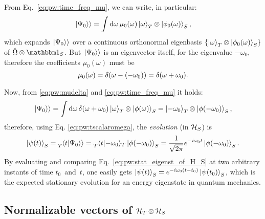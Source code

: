 From Eq.~\eqref{eq:pw:time_freq_mu}, we can write, in particular:
\begin{equation}
  \left.\left| \Psi_0 \right\rangle\right\rangle =
    \int \dd{\omega} \mu_0(\omega) \ket{\omega}_{T} \otimes \ket{\phi_0(\omega)}_{S} \text{,}
\end{equation}
which expands $\left.\left| \Psi_0 \right\rangle\right\rangle$ over a continuous orthonormal eigenbasis
$\left\{\ket{\omega}_{T} \otimes \ket{\phi_0(\omega)}_{S}\right\}$
of $\op{\Omega} \ox \idop_S$.
But $\left.\left| \Psi_0 \right\rangle\right\rangle$ is an eigenvector itself,
for the eigenvalue $-\omega_0$,
therefore the coefficients $\mu_0(\omega)$ must be
\begin{equation}\label{eq:pw:mudelta}
  \mu_0(\omega) = \delta\qty(\omega - \qty(-\omega_0) ) = \delta\qty(\omega + \omega_0) \text{.}
\end{equation}

Now, from \eqref{eq:pw:mudelta} and \eqref{eq:pw:time_freq_mu} it holds:
\[
  \left.\left| \Psi_0 \right\rangle\right\rangle = \int \dd{\omega} \delta(\omega + \omega_0) \ket{\omega}_T \otimes \ket{\phi(\omega)}_S =
    \ket{-\omega_0}_T \otimes \ket{\phi(-\omega_0)}_S \text{,}
\]
therefore, using Eq. \eqref{eq:pw:tscalaromega}, the \emph{evolution} (in $\mathcal{H}_S$) is
\begin{equation}
  \ket{\psi(t)}_S = \prescript{}{T}{\!\left.\left\langle t \middle| \Psi_0 \right\rangle\right\rangle} = \prescript{}{T}{\braket{t}{-\omega_0}}_{T} \ket{\phi(-\omega_0)}_S =
    \frac{1}{\sqrt{2\pi}} e^{-i\omega_0 t} \ket{\phi(-\omega_0)}_S \text{.}
\label{eq:pw:stat_eigenst_of_H_S}
\end{equation}
By evaluating and comparing Eq.~\eqref{eq:pw:stat_eigenst_of_H_S} at two arbitrary instants of time
$t_0$~and~$t$,
one easily gets
$\ket{\psi(t)}_{S} = e^{-i\omega_{0}(t-t_{0})} \ket{\psi(t_0)}_{S}$,
which is the expected stationary evolution for an energy eigenstate in quantum mechanics.

\subsection{Normalizable vectors of $\mathcal{H}_T \otimes \mathcal{H}_S$}
\label{sec:properpw}

